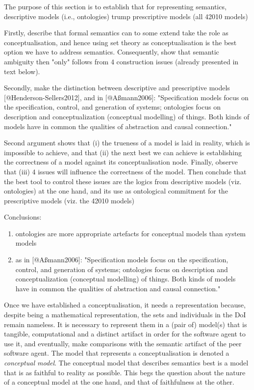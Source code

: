 \documentclass[a4paper,11pt,oneside,oldfontcommands]{memoir}
\theoremstyle{definition}
\theoremstyle{break}		%
\numberwithin{equation}{chapter}
\numberwithin{figure}{chapter}
\begin{document}
\begin{synopsis}
The purpose of this section is to establish that for representing semantics, descriptive models (i.e., ontologies) trump prescriptive models (all 42010 models)

Firstly, describe that formal semantics can to some extend take the role as conceptualisation, and hence using set theory as conceptualisation is the best option we have to address semantics. Consequently, show that semantic ambiguity then "only" follows from 4 construction issues (already presented in text below).

Secondly, make the distinction between descriptive and prescriptive models [@Henderson-Sellers2012], and in [@Aßmann2006]: "Specification models focus on the specification, control, and generation of systems; ontologies focus on description and conceptualization (conceptual modelling) of things. Both kinds of models have in common the qualities of abstraction and causal connection."

Second argument shows that (i) the trueness of a model is laid in reality, which is impossible to achieve, and that (ii) the next best we can achieve is establishing the correctness of a model against its conceptualisation node. Finally, observe that (iii) 4 issues will influence the correctness of the model. Then conclude that the best tool to control these issues are the logics from descriptive models (viz. ontologies) at the one hand, and its use as ontological commitment for the prescriptive models (viz. the 42010 models)

Conclusions:
\begin{enumerate}
\item ontologies are more appropriate artefacts for conceptual models than system models
\item as in [@Aßmann2006]: "Specification models focus on the specification, control, and generation of systems; ontologies focus on description and conceptualization (conceptual modelling) of things. Both kinds of models have in common the qualities of abstraction and causal connection."
\end{enumerate}
\end{synopsis}

Once we have established a conceptualisation, it needs a representation
because, despite being a mathematical representation, the sets and
individuals in the DoI remain nameless. It is necessary to represent
them in a (pair of) model(s) that is tangible, computational and a
distinct artifact in order for the software agent to use it, and
eventually, make comparisons with the semantic artifact of the peer
software agent. The model that represents a conceptualisation is denoted
a \emph{conceptual model}. The conceptual model that describes semantics
best is a model that is as faithful to reality as possible. This begs
the question about the nature of a conceptual model at the one hand, and
that of faithfulness at the other.
\end{document}
